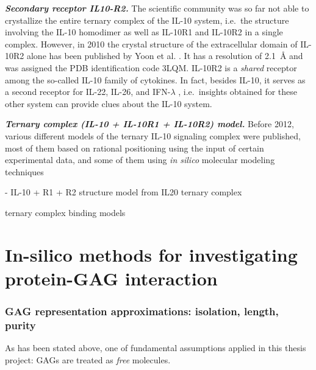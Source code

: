 \vspace{0.5cm}
\textit{\textbf{Secondary receptor IL10-R2.}}
The scientific community was so far not able to crystallize the entire ternary
complex of the IL-10 system, i.e.\ the structure involving the IL-10 homodimer
as well as IL-10R1 and IL-10R2 in a single complex. However, in 2010 the crystal
structure of the extracellular domain of IL-10R2 alone has been published by
Yoon et al. \cite{il10r2_structure_2010}. It has a resolution of
\SI{2.1}{\angstrom} and was assigned the PDB identification code 3LQM. IL-10R2
is a \textit{shared} receptor among the so-called IL-10 family of cytokines. In
fact, besides IL-10, it serves as a second receptor for IL-22, IL-26, and
IFN-$\lambda$ \cite{zdanov_review_2010}, i.e.\ insights obtained for these
other system can provide clues about the IL-10 system.


\vspace{0.5cm}
\textit{\textbf{Ternary complex (IL-10 + IL-10R1 + IL-10R2) model.}}
Before 2012, various different models of the ternary IL-10 signaling complex
were published, most of them based on rational positioning using the input of
certain experimental data, and some of them using \textit{in silico} molecular modeling techniques \cite{zdanov_review_2010, Josephson2001,
yoon_samestructdifffct_2005, il10r2_conf_changes_2006, il10r2_structure_2010}



\cite{logsdon_il20r2compl_2012}

        - IL-10 + R1 + R2 structure model from IL20 ternary complex

            ternary complex binding models
\lipsum[1-2]


\section{In-silico methods for investigating protein-GAG interaction}


\subsubsection{GAG representation approximations: isolation, length, purity}

As has been stated above, one of fundamental assumptions applied in this thesis
project: GAGs are treated as \textit{free} molecules.

